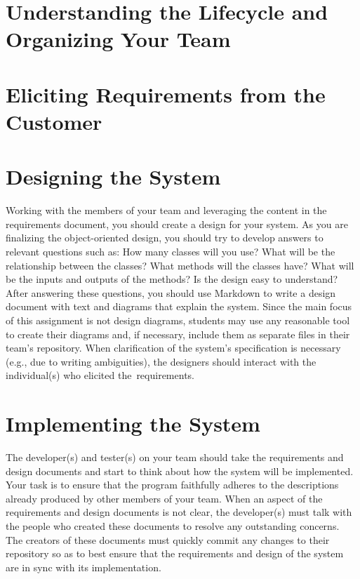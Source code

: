 \section*{Understanding the Lifecycle and Organizing Your Team}




\section*{Eliciting Requirements from the Customer}




\section*{Designing the System}

Working with the members of your team and leveraging the content in the requirements document, you should create a
design for your system.  As you are finalizing the object-oriented design, you should try to develop answers to relevant
questions such as: How many classes will you use? What will be the relationship between the classes? What methods will
the classes have? What will be the inputs and outputs of the methods?  Is the design easy to understand?  After
answering these questions, you should use Markdown to write a design document with text and diagrams that explain the
system. Since the main focus of this assignment is not design diagrams, students may use any reasonable tool to create
their diagrams and, if necessary, include them as separate files in their team's repository. When clarification of the
system's specification is necessary (e.g., due to writing ambiguities), the designers should interact with the
individual(s) who elicited \mbox{the requirements}.

\section*{Implementing the System}

The developer(s) and tester(s) on your team should take the requirements and design documents and start to think about
how the system will be implemented. Your task is to ensure that the program faithfully adheres to the descriptions
already produced by other members of your team. When an aspect of the requirements and design documents is not clear,
the developer(s) must talk with the people who created these documents to resolve any outstanding concerns. The creators
of these documents must quickly commit any changes to their repository so as to best ensure that the requirements and design
of the system are in sync with its implementation.

